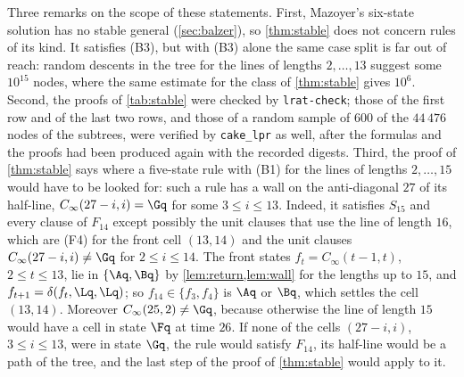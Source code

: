 Three remarks on the scope of these statements. First, Mazoyer's six-state
solution has no stable general (\cref{sec:balzer}), so \cref{thm:stable} does
not concern rules of its kind. It satisfies (B3), but with (B3) alone the same
case split is far out of reach: random descents in the tree for the lines of
lengths $2,\dots,13$ suggest some $10^{15}$ nodes, where the same estimate for
the class of \cref{thm:stable} gives $10^{6}$. Second, the proofs of
\cref{tab:stable} were checked by \texttt{lrat-check}; those of the first row
and of the last two rows, and those of a random sample of $600$ of the
$44\,476$ nodes of the subtrees, were verified by \texttt{cake\_lpr} as well,
after the formulas and the proofs had been produced again with the recorded
digests. Third, the proof of
\cref{thm:stable} says where a five-state rule with (B1) for the lines of
lengths $2,\dots,15$ would have to be looked for: such a rule has a wall on the
anti-diagonal $27$ of its half-line, $C_\infty(27-i,i)=\Gq$ for some
$3\le i\le13$. Indeed, it satisfies $S_{15}$ and every clause of $F_{14}$ except
possibly the unit clauses that use the line of length $16$, which are (F4) for
the front cell $(13,14)$ and the unit clauses $C_\infty(27-i,i)\ne\Gq$ for
$2\le i\le14$. The front states $f_t=C_\infty(t-1,t)$, $2\le t\le13$, lie in
$\{\Aq,\Bq\}$ by \cref{lem:return,lem:wall} for the lengths up to $15$, and
$f_{t+1}=\delta(f_t,\Lq,\Lq)$; so $f_{14}\in\{f_3,f_4\}$ is $\Aq$ or $\Bq$,
which settles the cell $(13,14)$. Moreover $C_\infty(25,2)\ne\Gq$, because
otherwise the line of length $15$ would have a cell in state $\Fq$ at time
$26$. If none of the cells $(27-i,i)$, $3\le i\le13$, were in state $\Gq$,
the rule would satisfy $F_{14}$, its half-line would be a path of the tree, and
the last step of the proof of \cref{thm:stable} would apply to it.
